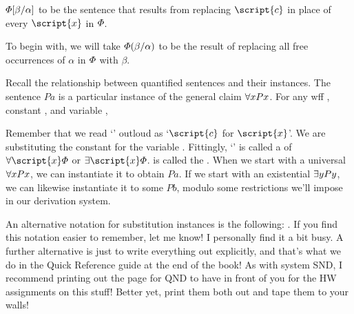 $\varPhi[\beta/\alpha]$ to be the sentence that results from replacing $\script{c}$ in place of every $\script{x}$ in $\varPhi{}$.

To begin with, we will take $\varPhi(\beta/\alpha)$ to be the result of replacing all free occurrences of $\alpha$ in $\varPhi$ with $\beta$. 
 
Recall the relationship between quantified sentences and their instances. The sentence $Pa$ is a particular instance of the general claim $\forall x Px$. For any wff \metaA{}, constant , and variable ,


Remember that we read `' outloud as `$\script{c}$ for $\script{x}$'. We are substituting the constant  for the variable . Fittingly, `\metaA{}' is called a  of $\qt{\forall}{\script{x}}\metaA{}$ or $\qt{\exists}{\script{x}}\metaA{}$.  is called the . When we start with a universal $\forall x Px$, we can instantiate it to obtain $Pa$. If we start with an existential $\exists yPy$, we can likewise instantiate it to some $Pb$, modulo some restrictions we'll impose in our derivation system. 

{\color{black}An alternative notation for substitution instances is the following: \metaA{}\hspace{.15em}. If you find this notation easier to remember, let me know! I personally find it a bit busy. A further alternative is just to write everything out explicitly, and that's what we do in the Quick Reference guide at the end of the book! As with system SND, I recommend printing out the page for QND to have in front of you for the HW assignments on this stuff! Better yet, print them both out and tape them to your walls!} 










